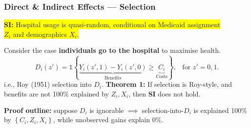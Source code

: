 \documentclass[dvipsnames,handout]{beamer} %
\renewcommand{\vec}[1]{\boldsymbol{\mathit{#1}}}                           %
\newcommand{\indicator}[1]{\mathds{1}\left\{ #1 \right\}}                  %
\begin{document}
\begin{frame}[noframenumbering]
    \frametitle{Direct \& Indirect Effects --- Selection} 
    \colorbox{yellow}{\textbf{SI:}
        Hospital usage is quasi-random, conditional on Medicaid assignment} \\
    \colorbox{yellow}{$Z_i$ and demographics $\vec X_i$.}

    \vskip0.25cm
    Consider the case \textbf{individuals go to the hospital} to maximise health.
    \[ D_i \left( z' \right) = \indicator{
        \underbrace{Y_i\left( z', 1 \right) - Y_i\left( z', 0 \right)}_{\text{Benefits}}
        \geq \underbrace{C_i}_{\text{Costs}}}, \;\;\; \text{for } z'=0,1.
    \]
    i.e., Roy (1951) selection into $D_i$.
    \vfill
    \textbf{Theorem 1:}
    If selection is Roy-style, and benefits are not 100\% explained by $Z_i, \vec X_i$, then \textbf{SI} does not hold.

    \vskip0.125cm
    \textbf{Proof outline:} suppose $D_i$ is ignorable $\implies$ selection-into-$D_i$ is explained 100\% by $\left\{ C_i, Z_i, \vec X_i \right\}$, while unobserved gains explain 0\%.
\end{frame}
\end{document}
